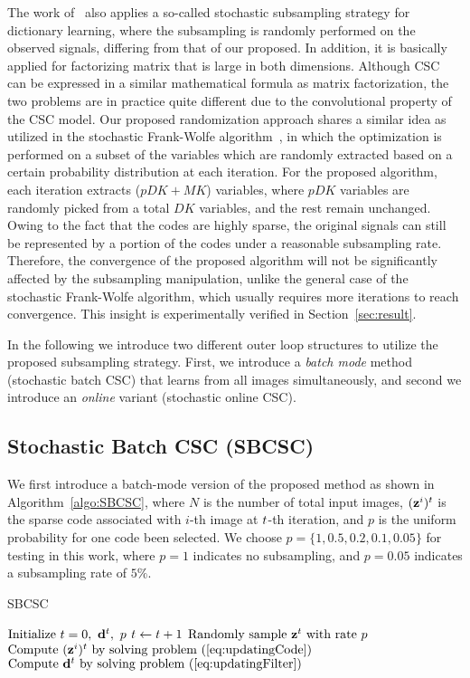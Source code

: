 The work of~\cite{mensch2016dictionary} also applies a so-called
stochastic subsampling strategy for dictionary learning, where the
subsampling is randomly performed on the observed signals, differing
from that of our proposed. In addition, it is basically applied for
factorizing matrix that is large in both dimensions. Although CSC can
be expressed in a similar mathematical formula as matrix factorization, the two
problems are in practice quite different due to the convolutional
property of the CSC model. Our proposed randomization
approach shares a similar idea as utilized in the stochastic Frank-Wolfe
algorithm~\cite{reddi2016stochastic,pmlr-v80-kerdreux18a}, in which
the optimization is performed on a subset of the variables which are
randomly extracted based on a certain probability distribution at each
iteration. For the proposed algorithm, each iteration extracts
($pDK+MK$) variables, where $pDK$ variables are randomly picked from a
total $DK$ variables, and the rest remain unchanged. Owing to the fact
that the codes are highly sparse, the original signals can still be
represented by a portion of the codes under a reasonable subsampling
rate. Therefore, the convergence of the proposed algorithm will not be
significantly affected by the subsampling manipulation, unlike the
general case of the stochastic Frank-Wolfe algorithm, which usually
requires more iterations to reach convergence. This insight is
experimentally verified in Section~\ref{sec:result}.

In the following we introduce two different outer loop structures to
utilize the proposed subsampling strategy. First, we introduce a {\em
  batch mode} method (stochastic batch CSC) that learns from all
images simultaneously, and second we introduce an {\em online}
variant (stochastic online CSC).

\subsection{Stochastic Batch CSC (SBCSC)}
We first introduce a batch-mode version of the proposed method as
shown in Algorithm~\ref{algo:SBCSC}, where $N$ is the number of total
input images, $(\code^i)^{\ite}$ is the sparse code associated with $i$-th
image at $t$-th iteration, and $p$ is the uniform probability for one code been
selected. We choose $p=\{1, 0.5, 0.2, 0.1, 0.05\}$ for testing in this
work, where $p=1$ indicates no subsampling, and $p=0.05$ indicates a
subsampling rate of $5\%$.

\begin{algorithm}[H]
\caption{SBCSC} \label{algo:SBCSC}
\begin{algorithmic}[1]
\State $\text{Initialize}  ~ \ite=0, ~\filter^t, ~p$
    \State $t \gets t+1$
    \State $ \text{Randomly sample }\code^{\ite} \text{ with rate } p $
        \State $ \text{Compute } (\code^i)^{\ite} \text{ by solving problem~(\ref{eq:updatingCode}})$
    \EndFor
    \State $\text{Compute } \filter^{\ite} \text{ by solving problem~(\ref{eq:updatingFilter}})$
\EndWhile
\end{algorithmic}
\end{algorithm}


